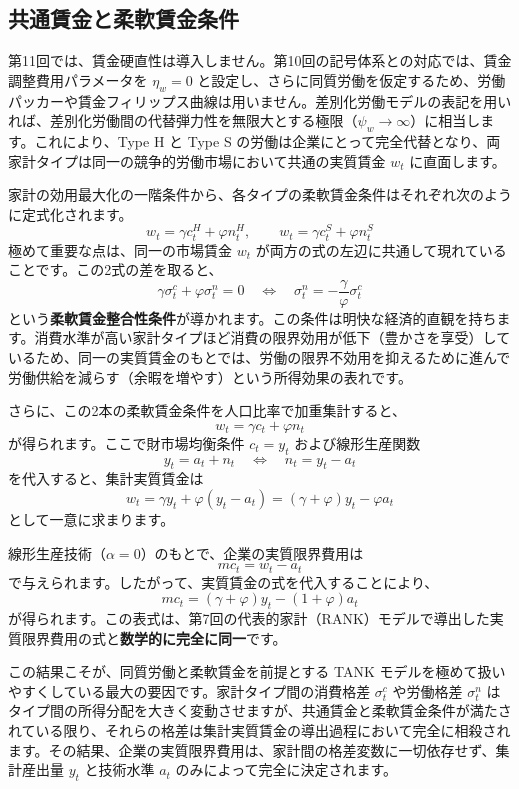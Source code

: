 \documentclass[
  japanese,
  lualatex,
  ja=standard,
  12pt,
  a4paper]{ltjsarticle}
\begin{document}
\subsection{共通賃金と柔軟賃金条件}\label{ux5171ux901aux8cc3ux91d1ux3068ux67d4ux8edfux8cc3ux91d1ux6761ux4ef6}

第11回では、賃金硬直性は導入しません。第10回の記号体系との対応では、賃金調整費用パラメータを
\(\eta_w=0\)
と設定し、さらに同質労働を仮定するため、労働パッカーや賃金フィリップス曲線は用いません。差別化労働モデルの表記を用いれば、差別化労働間の代替弾力性を無限大とする極限（\(\psi_w \to \infty\)）に相当します。これにより、Type
H と Type S
の労働は企業にとって完全代替となり、両家計タイプは同一の競争的労働市場において共通の実質賃金
\(w_t\) に直面します。

家計の効用最大化の一階条件から、各タイプの柔軟賃金条件はそれぞれ次のように定式化されます。
\[
w_t = \gamma c_t^H + \varphi n_t^H,
\qquad
w_t = \gamma c_t^S + \varphi n_t^S
\] 極めて重要な点は、同一の市場賃金 \(w_t\)
が両方の式の左辺に共通して現れていることです。この2式の差を取ると、 \[
\gamma \sigma_t^c + \varphi \sigma_t^n = 0
\quad \iff \quad
\sigma_t^n = -\frac{\gamma}{\varphi} \sigma_t^c
\]
という\textbf{柔軟賃金整合性条件}が導かれます。この条件は明快な経済的直観を持ちます。消費水準が高い家計タイプほど消費の限界効用が低下（豊かさを享受）しているため、同一の実質賃金のもとでは、労働の限界不効用を抑えるために進んで労働供給を減らす（余暇を増やす）という所得効果の表れです。


さらに、この2本の柔軟賃金条件を人口比率で加重集計すると、 \[
w_t = \gamma c_t + \varphi n_t
\] が得られます。ここで財市場均衡条件 \(c_t = y_t\) および線形生産関数
\[
y_t = a_t + n_t \quad \iff \quad n_t = y_t - a_t
\] を代入すると、集計実質賃金は \[
w_t
=
\gamma y_t + \varphi(y_t - a_t)
=
(\gamma+\varphi) y_t - \varphi a_t
\] として一意に求まります。


線形生産技術（\(\alpha=0\)）のもとで、企業の実質限界費用は \[
mc_t = w_t - a_t
\] で与えられます。したがって、実質賃金の式を代入することにより、 \[
mc_t
=
(\gamma+\varphi) y_t - (1+\varphi) a_t
\]
が得られます。この表式は、第7回の代表的家計（RANK）モデルで導出した実質限界費用の式と\textbf{数学的に完全に同一}です。

この結果こそが、同質労働と柔軟賃金を前提とする TANK
モデルを極めて扱いやすくしている最大の要因です。家計タイプ間の消費格差
\(\sigma_t^c\) や労働格差 \(\sigma_t^n\)
はタイプ間の所得分配を大きく変動させますが、共通賃金と柔軟賃金条件が満たされている限り、それらの格差は集計実質賃金の導出過程において完全に相殺されます。その結果、企業の実質限界費用は、家計間の格差変数に一切依存せず、集計産出量
\(y_t\) と技術水準 \(a_t\) のみによって完全に決定されます。
\end{document}
